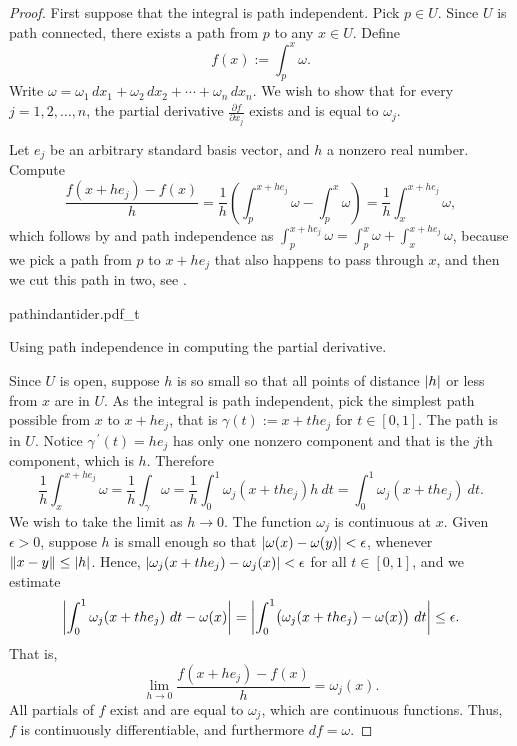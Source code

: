\begin{proof}
First suppose that the integral is path independent.  Pick $p \in U$.  Since
$U$ is path connected, there exists a path from $p$ to any $x \in U$.
Define
\begin{equation*}
f(x) := \int_{p}^x \omega .
\end{equation*}
Write $\omega = \omega_1 \,dx_1 + \omega_2 \,dx_2 + \cdots + \omega_n \,dx_n$.
We wish to show that for every $j = 1,2,\ldots,n$, the
partial derivative $\frac{\partial f}{\partial x_j}$ exists
and is equal to $\omega_j$.

Let $e_j$ be an arbitrary standard basis vector, and $h$ a nonzero real
number.  Compute
\begin{equation*}
\frac{f(x+h e_j) - f(x)}{h} =
\frac{1}{h} \left( \int_{p}^{x+he_j} \omega - \int_{p}^x \omega \right)
=
\frac{1}{h} \int_{x}^{x+he_j} \omega ,
\end{equation*}
which follows by  and path independence as 
$\int_{p}^{x+he_j} \omega =
\int_{p}^{x} \omega +
\int_{x}^{x+he_j} \omega$, because we pick a path from $p$ to
$x+he_j$ that also happens to pass through $x$, and then we cut this path in
two, see .

\begin{myfigureht}
{pathindantider.pdf_t}
\caption{Using path independence in computing the partial
derivative.\label{fig:pathindantider}}
\end{myfigureht}


Since $U$ is open, suppose $h$ is so small so that all points of distance
$\left\lvert {h} \right\rvert$ or
less from $x$ are in $U$.
As the integral is path independent,
pick the simplest path possible from $x$ to $x+he_j$, that is
$\gamma(t) := x+t he_j$ for $t \in [0,1]$.  The path is in $U$.
Notice $\gamma^{\:\prime}(t) = h e_j$
has only one nonzero component and that is the $j$th component, which is
$h$.  Therefore
\begin{equation*}
\frac{1}{h} \int_{x}^{x+he_j} \omega 
=
\frac{1}{h} \int_{\gamma} \omega 
=
\frac{1}{h} \int_0^1 \omega_j(x+the_j) h ~ dt 
=
\int_0^1 \omega_j(x+the_j) ~ dt  .
\end{equation*}
We wish to take the limit as $h \to 0$.  The function $\omega_j$ is
continuous at $x$.  Given $\epsilon > 0$, suppose $h$ is small enough so that
$\left\lvert {\omega(x)-\omega(y)} \right\rvert < \epsilon$, whenever $\lVert {x-y} \rVert \leq \left\lvert {h} \right\rvert$.
Hence,
$\left\lvert {\omega_j(x+the_j)-\omega_j(x)} \right\rvert < \epsilon$ for all $t \in [0,1]$,
and we estimate
\begin{equation*}
\left\lvert {\int_0^1 \omega_j(x+the_j) ~ dt  - \omega(x)} \right\rvert
=
\left\lvert {\int_0^1 \bigl( \omega_j(x+the_j) - \omega(x) \bigr) ~ dt} \right\rvert
\leq
\epsilon .
\end{equation*}
That is,
\begin{equation*}
\lim_{h\to 0}\frac{f(x+h e_j) - f(x)}{h} = \omega_j(x) .
\end{equation*}
All partials of $f$ exist and are equal to $\omega_j$, which are continuous
functions.  Thus, $f$ is continuously differentiable, and furthermore
$df = \omega$.


\end{proof}
